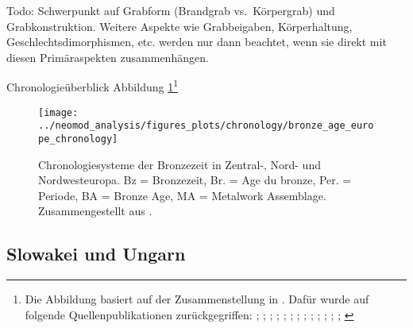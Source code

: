 \documentclass[openany,twoside,twocolumn]{book}
\let\rmarkdownfootnote\footnote%
\def\footnote{\protect\rmarkdownfootnote}
\begin{document}
Todo: Schwerpunkt auf Grabform (Brandgrab vs.~Körpergrab) und
Grabkonstruktion. Weitere Aspekte wie Grabbeigaben, Körperhaltung,
Geschlechtsdimorphismen, etc. werden nur dann beachtet, wenn sie direkt
mit diesen Primäraspekten zusammenhängen.

Chronologieüberblick Abbildung \ref{fig:general-chronology}\footnote{Die
  Abbildung basiert auf der Zusammenstellung in
  \textcite{roberts_old_2013}. Dafür wurde auf folgende
  Quellenpublikationen zurückgegriffen:
  \textcite{arnoldussen_bronze_2008}; \textcite{bourgeois_lage_2005};
  \textcite{burgess_bronze_1974}; \textcite{burgess_age_1980};
  \textcite{brindley_dating_2007}; \textcite{eogan_accomplished_1994};
  \textcite{gerloff_reineckes_2007}; \textcite{gerloff_atlantic_2010};
  \textcite{de_laet_belgique_1982};
  \textcite{lanting_14c-chronologie_2001};
  \textcite{louwe_kooijmanns_prehistory_2005};
  \textcite{needham_chronology_1996};
  \textcite{needham_independent_1997}; \textcite{needham_first_2010}}

\begin{landscape}
\begin{figure}
\texttt{[image: ../neomod\_analysis/figures\_plots/chronology/bronze\_age\_europe\_chronology]} \caption[Chronologiesysteme der Bronzezeit in Zentral-, Nord- und Nordwesteuropa]{Chronologiesysteme der Bronzezeit in Zentral-, Nord- und Nordwesteuropa. Bz = Bronzezeit, Br. = Age du bronze, Per. = Periode, BA = Bronze Age, MA = Metalwork Assemblage. Zusammengestellt aus \textcite{roberts_old_2013}.}\label{fig:general-chronology}
\end{figure}
\end{landscape}

\hypertarget{slowakei-und-ungarn}{%
\subsection{Slowakei und Ungarn}\label{slowakei-und-ungarn}}
\end{document}
